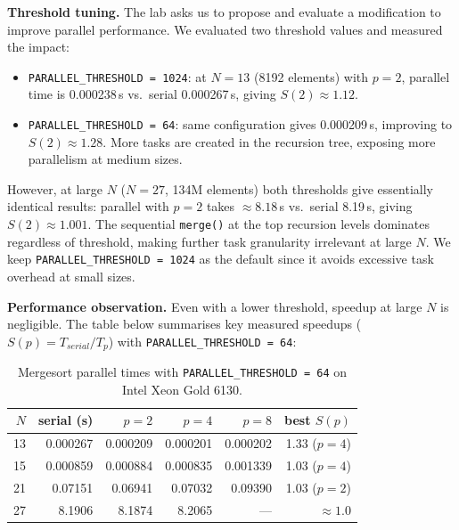 \documentclass[11pt,a4paper]{article}
\begin{document}
\textbf{Threshold tuning.}
The lab asks us to propose and evaluate a modification to improve parallel performance.
We evaluated two threshold values and measured the impact:
\begin{itemize}
    \item \texttt{PARALLEL\_THRESHOLD = 1024}: at $N=13$ (8192 elements) with $p=2$, parallel time is 0.000238\,s vs.\  serial 0.000267\,s, giving $S(2) \approx 1.12$.
    \item \texttt{PARALLEL\_THRESHOLD = 64}: same configuration gives 0.000209\,s, improving to $S(2) \approx 1.28$. More tasks are created in the recursion tree, exposing more parallelism at medium sizes.
\end{itemize}
However, at large $N$ ($N=27$, 134M elements) both thresholds give essentially identical results: parallel with $p=2$ takes $\approx 8.18$\,s vs.\ serial 8.19\,s, giving $S(2) \approx 1.001$.
The sequential \texttt{merge()} at the top recursion levels dominates regardless of threshold, making further task granularity irrelevant at large $N$.
We keep \texttt{PARALLEL\_THRESHOLD = 1024} as the default since it avoids excessive task overhead at small sizes.

\textbf{Performance observation.}
Even with a lower threshold, speedup at large $N$ is negligible. The table below summarises key measured speedups ($S(p) = T_{serial}/T_p$) with \texttt{PARALLEL\_THRESHOLD = 64}:

\begin{table}[H]
\centering
\begin{tabular}{rrrrrr}
\toprule
$N$ & serial (s) & $p=2$ & $p=4$ & $p=8$ & best $S(p)$ \\
\midrule
13 & 0.000267 & 0.000209 & 0.000201 & 0.000202 & 1.33 ($p=4$) \\
15 & 0.000859 & 0.000884 & 0.000835 & 0.001339 & 1.03 ($p=4$) \\
21 & 0.07151  & 0.06941  & 0.07032  & 0.09390  & 1.03 ($p=2$) \\
27 & 8.1906   & 8.1874   & 8.2065   & —        & $\approx 1.0$ \\
\bottomrule
\end{tabular}
\caption{Mergesort parallel times with \texttt{PARALLEL\_THRESHOLD = 64} on Intel Xeon Gold 6130.}
\end{table}
\end{document}
